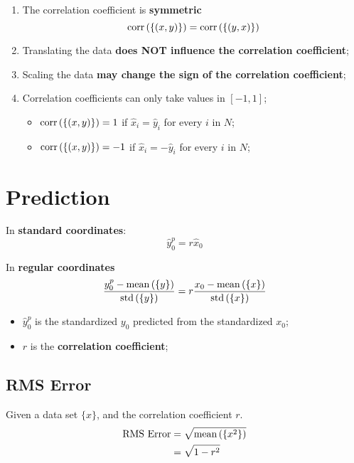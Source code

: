     \begin{enumerate}
      \item The correlation coefficient is \textbf{symmetric}
      \begin{equation}
        \operatorname{corr}\left( \{ \left( x, y \right) \} \right) = \operatorname{corr}\left( \{ \left( y, x \right) \} \right)
      \end{equation}
      
      \item Translating the data \textbf{does NOT influence the correlation coefficient};
      \item Scaling the data \textbf{may change the sign of the correlation coefficient};
      \item Correlation coefficients can only take values in $ \left[ -1, 1 \right] $;
      \begin{itemize}
        \item $ \operatorname{corr}\left( \{ \left( x, y \right) \} \right) = 1 $ if $ \hat{x}_{i} = \hat{y}_{i} $ for every $ i $ in $ N $;
        \item $ \operatorname{corr}\left( \{ \left( x, y \right) \} \right) = -1 $ if $ \hat{x}_{i} = -\hat{y}_{i} $ for every $ i $ in $ N $;
      \end{itemize}
    \end{enumerate}
    
\section{Prediction}
    
  In \textbf{standard coordinates}:
  \begin{equation}
    \hat{y}^{p}_{0} = r \hat{x}_{0}
  \end{equation}

  In \textbf{regular coordinates}
  \begin{equation}
    \frac{ y^{p}_{0} - \operatorname{mean}\left( \{ y \} \right) }{ \operatorname{std}\left( \{ y \} \right) } = r \frac{ x_{0} - \operatorname{mean}\left( \{ x \} \right) }{ \operatorname{std}\left( \{ x \} \right) } 
  \end{equation}
  
  \begin{itemize}
    \item $ \hat{y}^{p}_{0} $ is the standardized $ y_{0} $ predicted from the standardized $ x_{0} $;
    \item $ r $ is the \textbf{correlation coefficient};
  \end{itemize}
  
  \subsection{RMS Error}
  
    Given a data set $ \{ x \} $, and the correlation coefficient $ r $.
    \begin{align}
      \text{RMS Error} &= \sqrt{ \operatorname{mean}\left( \{ x^{2} \} \right) } \\
      &= \sqrt{1 - r^{2}}
    \end{align}